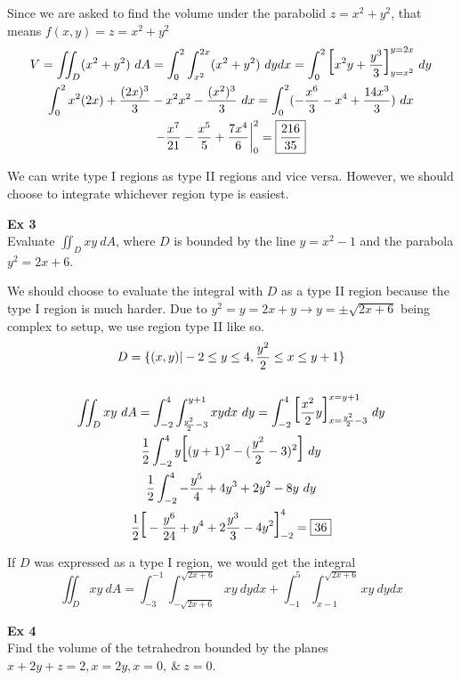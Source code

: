 \documentclass{article}
\begin{document}
  Since we are asked to find the volume under the parabolid $ z = x^{2}+y^{2} $, that means $ f(x,y) = z = x^{2}+y^{2} $
  \[
    \begin{gathered}
    V = \iint_D (x^{2}+y^{2})~dA = \int^{2}_{0} \int^{2x}_{x^{2}}(x^{2}+y^{2})~dydx = \int^{2}_{0} \text{\huge{[}} x^{2}y+\frac{y^{3}}{3} \text{\huge{]}}^{y=2x}_{y=x^{2}}~dy\\
    \int^{2}_{0} x^{2}(2x)+\frac{(2x)^{3}}{3} - x^{2}x^{2} - \frac{(x^{2})^{3}}{3}~dx = \int^{2}_{0} (-\frac{x^{6}}{3}-x^{4}+\frac{14x^{3}}{3})~dx\\
    -\frac{x^{7}}{21}-\frac{x^{5}}{5}+\frac{7x^{4}}{6} \bigg|^{2}_0 = \boxed{\frac{216}{35}} 
    \end{gathered}
  \]
 
  We can write type I regions as type II regions and vice versa. However, we should choose to integrate whichever region type is easiest. 

  \textbf{Ex 3}\\
  Evaluate $ \iint_D xy~dA $, where $ D $ is bounded by the line $ y = x^{2}-1 $ and the parabola $ y^{2}=2x+6 $.

  We should choose to evaluate the integral with $ D $ as a type II region because the type I region is much harder. Due to $ y^{2} = y=2x+y \to y = \pm \sqrt{2x+6} $ being complex to setup, we use region type II like so.
  \[
    \begin{gathered}
    D = \{ (x,y) | -2 \le y \le 4, \frac{y^{2}}{2} \le x \le y+1 \}\\
    ~\\
    \iint_D xy~dA = \int^{4}_{-2} \int^{y+1}_{\frac{y^{2}}{2}-3} xydx~dy = \int^{4}_{-2} \text{\huge{[}} \frac{x^{2}}{2}y \text{\huge{]}}^{x=y+1}_{x=\frac{y^{2}}{2}-3}~dy\\
    \frac{1}{2} \int^{4}_{-2} y\text{\huge{[}} (y+1)^{2} - (\frac{y^{2}}{2}-3)^{2} \text{\huge{]}}~dy\\
    \frac{1}{2} \int^{4}_{-2} -\frac{y^{5}}{4}+4y^{3}+2y^{2}-8y~dy\\
    \frac{1}{2} \text{\huge{[}} -\frac{y^{6}}{24}+y^{4}+2\frac{y^{3}}{3}-4y^{2} \text{\huge{]}}^{4}_{-2} = \boxed{36} 
    \end{gathered}
  \]

  If $ D $ was expressed as a type I region, we would get the integral
  \[
    \iint_D xy~dA = \int^{-1}_{-3} \int^{\sqrt{2x+6}}_{-\sqrt{2x+6}}xy ~dydx + \int^{5}_{-1} \int^{\sqrt{2x+6}}_{x-1}xy ~dydx  
  \]
  
  \textbf{Ex 4}\\
  Find the volume of the tetrahedron bounded by the planes $ x+2y+z=2, x=2y, x=0, ~\&~ z=0 $.
\end{document}
